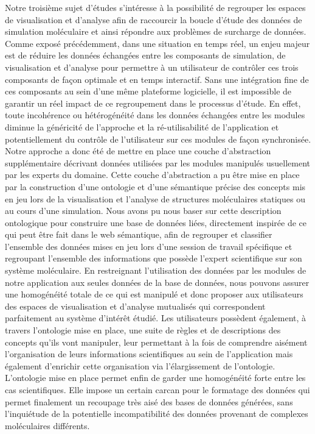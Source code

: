 Notre troisième sujet d'études s'intéresse à la possibilité de regrouper les espaces de visualisation et d'analyse afin de raccourcir la boucle d'étude des données de simulation moléculaire et ainsi répondre aux problèmes de surcharge de données. Comme exposé précédemment, dans une situation en temps réel, un enjeu majeur est de réduire les données échangées entre les composants de simulation, de visualisation et d'analyse pour permettre à un utilisateur de contrôler ces trois composants de façon optimale et en temps interactif. Sans une intégration fine de ces composants au sein d'une même plateforme logicielle, il est impossible de garantir un réel impact de ce regroupement dans le processus d'étude. En effet, toute incohérence ou hétérogénéité dans les données échangées entre les modules diminue la généricité de l'approche et la ré-utilisabilité de l'application et potentiellement du contrôle de l'utilisateur sur ces modules de façon synchronisée. Notre approche a donc été de mettre en place une couche d'abstraction supplémentaire décrivant données utilisées par les modules manipulés usuellement par les experts du domaine. Cette couche d'abstraction a pu être mise en place par la construction d'une ontologie et d'une sémantique précise des concepts mis en jeu lors de la visualisation et l'analyse de structures moléculaires statiques ou au cours d'une simulation. Nous avons pu nous baser sur cette description ontologique pour construire une base de données liées, directement inspirée de ce qui peut être fait dans le web sémantique, afin de regrouper et classifier l'ensemble des données mises en jeu lors d'une session de travail spécifique et regroupant l'ensemble des informations que possède l'expert scientifique sur son système moléculaire. En restreignant l'utilisation des données par les modules de notre application aux seules données de la base de données, nous pouvons assurer une homogénéité totale de ce qui est manipulé et donc proposer aux utilisateurs des espaces de visualisation et d'analyse mutualisés qui correspondent parfaitement au système d’intérêt étudié. Les utilisateurs possèdent également, à travers l'ontologie mise en place, une suite de règles et de descriptions des concepts qu'ils vont manipuler, leur permettant à la fois de comprendre aisément l'organisation de leurs informations scientifiques au sein de l'application mais également d'enrichir cette organisation via l'élargissement de l'ontologie. L'ontologie mise en place permet enfin de garder une homogénéité forte entre les cas scientifiques. Elle impose un certain carcan pour le formatage des données qui permet finalement un recoupage très aisé des bases de données générées, sans l'inquiétude de la potentielle incompatibilité des données provenant de complexes moléculaires différents.


